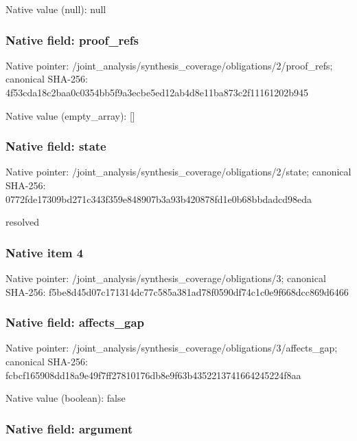 \documentclass[10pt,a4paper]{article}
\begin{document}
Native value (null): null



\subsubsection{Native field: proof\_refs}


Native pointer: /joint\_analysis/synthesi\allowbreak{}s\_coverage/obligations/2\allowbreak{}/proof\_refs; canonical SHA-256: 4f53cda18c2baa0c0354bb5f\allowbreak{}9a3ecbe5ed12ab4d8e11ba87\allowbreak{}3c2f11161202b945



Native value (empty\_array): []



\subsubsection{Native field: state}


Native pointer: /joint\_analysis/synthesi\allowbreak{}s\_coverage/obligations/2\allowbreak{}/state; canonical SHA-256: 0772fde17309bd271c343f35\allowbreak{}9e848907b3a93b420878fd1e\allowbreak{}0b68bbdadcd98eda


resolved


\subsubsection{Native item 4}


Native pointer: /joint\_analysis/synthesi\allowbreak{}s\_coverage/obligations/3; canonical SHA-256: f5be8d45d07c171314dc77c5\allowbreak{}85a381ad78f0590df74c1c0e\allowbreak{}9f668dcc869d6466



\subsubsection{Native field: affects\_gap}


Native pointer: /joint\_analysis/synthesi\allowbreak{}s\_coverage/obligations/3\allowbreak{}/affects\_gap; canonical SHA-256: fcbcf165908dd18a9e49f7ff\allowbreak{}27810176db8e9f63b4352213\allowbreak{}741664245224f8aa



Native value (boolean): false



\subsubsection{Native field: argument}
\end{document}
